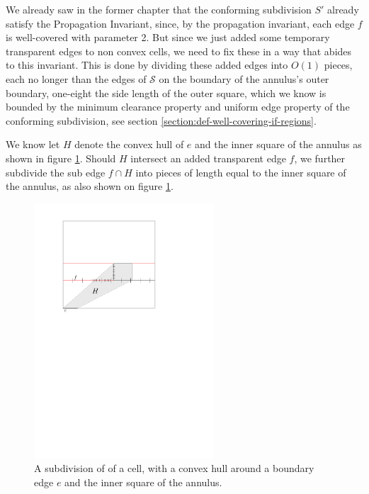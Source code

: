 We already saw in the former chapter that the conforming subdivision $S'$ already satisfy the Propagation 
Invariant, since, by the propagation invariant, each edge $f$ is well-covered with parameter 2. But since we 
just added some temporary transparent edges to non convex cells, we need to fix these in a way that abides to 
this invariant. This is done by dividing these added edges into $O(1)$ pieces, each no longer than the edges 
of $\mathcal{S}$ on the boundary of the annulus's outer boundary, one-eight the side length of the outer 
square, which we know is bounded by the minimum clearance property and uniform edge property of the conforming 
subdivision, see section \ref{section:def-well-covering-if-regions}. 

We know let $H$ denote the convex hull of $e$ and the inner square of the annulus as shown in figure 
\ref{fig:subdividedconvexhull}. Should $H$ intersect an added transparent edge $f$, we further subdivide the 
sub edge $f \cap H$ into pieces of length equal to the inner square of the annulus, as also shown on figure 
\ref{fig:subdividedconvexhull}. 

\begin{figure}[H]
	\centering
	\includegraphics[width=0.6\textwidth]{figures/subdividedconvexhull.pdf}
	\caption{A subdivision of of a cell, with a convex hull around a boundary edge $e$ and the inner square of 
    		 the annulus.}
	\label{fig:subdividedconvexhull}
\end{figure}

